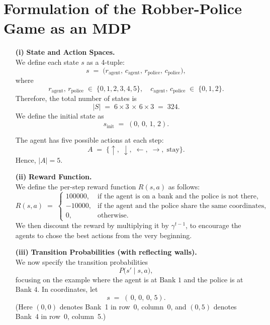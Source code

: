 \section*{Formulation of the Robber-Police Game as an MDP}

\begin{enumerate}

  \item[\textbf{(i)}]
    \textbf{State and Action Spaces.} \\
    We define each state \(s\) as a 4-tuple:
    \[
      s \;=\; \bigl(r_{\text{agent}},\,c_{\text{agent}},\,r_{\text{police}},\,c_{\text{police}}\bigr),
    \]
    where
    \[
      r_{\text{agent}},\,r_{\text{police}} \;\in\;\{0,1,2,3,4,5\},
      \quad
      c_{\text{agent}},\,c_{\text{police}} \;\in\;\{0,1,2\}.
    \]
    Therefore, the total number of states is
    \[
      |S| \;=\; 6 \times 3 \,\times\, 6 \times 3 \;=\; 324.
    \]
    We define the initial state as
    \[
      s_{\text{init}} \;=\; (0,\,0,\,1,\,2).
    \]

    The agent has five possible actions at each step:
    \[
      A \;=\; \{\uparrow,\;\downarrow,\;\leftarrow,\;\rightarrow,\;\text{stay}\}.
    \]
    Hence, \(\lvert A \rvert = 5\).

  \item[\textbf{(ii)}]
    \textbf{Reward Function.} \\
    We define the per-step reward function \(R(s,a)\) as follows:
    \[
      R(s, a) \;=\;
      \begin{cases}
        100000, & \text{if the agent is on a bank and the police is not there,} \\
        -10000, & \text{if the agent and the police share the same coordinates,} \\
        0, & \text{otherwise.}
      \end{cases}
    \]
    We then discount the reward by multiplying it by \(\gamma^{t-1}\), to encourage the agents to chose the best actions from the very beginning.

  \item[\textbf{(iii)}]
    \textbf{Transition Probabilities (with reflecting walls).} \\
    We now specify the transition probabilities
    \[
      P\bigl(s' \mid s, a\bigr),
    \]
    focusing on the example where the agent is at \(\text{Bank 1}\) and the police is at \(\text{Bank 4}\). 
    In coordinates, let
    \[
      s \;=\; (\,0,\,0,\,0,\,5).
    \]
    (Here \((0,0)\) denotes Bank~1 in row~0, column~0, and \((0,5)\) denotes Bank~4 in row~0, column~5.)


\end{enumerate}
